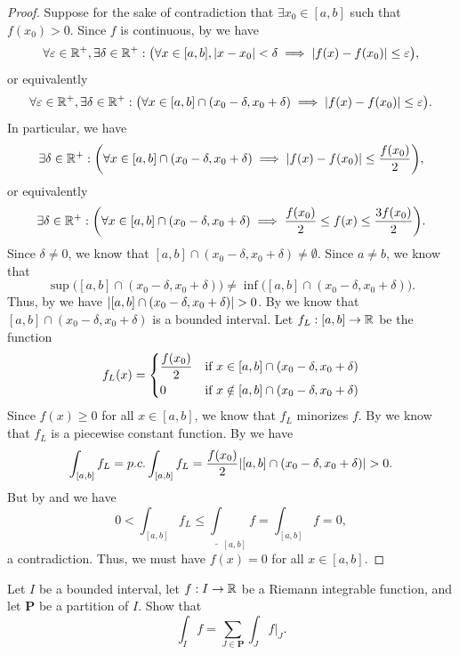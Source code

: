\begin{proof}
  Suppose for the sake of contradiction that \(\exists x_0 \in [a, b]\) such that \(f(x_0) > 0\).
  Since \(f\) is continuous, by  we have
  \[
    \forall \varepsilon \in \mathbb{R}^+, \exists \delta \in \mathbb{R}^+ : \big(\forall x \in [a, b], \left\lvert x - x_0\right\rvert < \delta \implies \left\lvert f(x) - f(x_0)\right\rvert \leq \varepsilon\big),
  \]
  or equivalently
  \[
    \forall \varepsilon \in \mathbb{R}^+, \exists \delta \in \mathbb{R}^+ : \big(\forall x \in [a, b] \cap (x_0 - \delta, x_0 + \delta) \implies \left\lvert f(x) - f(x_0)\right\rvert \leq \varepsilon\big).
  \]
  In particular, we have
  \[
    \exists \delta \in \mathbb{R}^+ : \bigg(\forall x \in [a, b] \cap (x_0 - \delta, x_0 + \delta) \implies \left\lvert f(x) - f(x_0)\right\rvert \leq \dfrac{f(x_0)}{2}\bigg),
  \]
  or equivalently
  \[
    \exists \delta \in \mathbb{R}^+ : \bigg(\forall x \in [a, b] \cap (x_0 - \delta, x_0 + \delta) \implies \dfrac{f(x_0)}{2} \leq f(x) \leq \dfrac{3 f(x_0)}{2}\bigg).
  \]
  Since \(\delta \neq 0\), we know that \([a, b] \cap (x_0 - \delta, x_0 + \delta) \neq \emptyset\).
  Since \(a \neq b\), we know that
  \[
    \sup\big([a, b] \cap (x_0 - \delta, x_0 + \delta)\big) \neq \inf\big([a, b] \cap (x_0 - \delta, x_0 + \delta)\big).
  \]
  Thus, by  we have \(\left\lvert[a, b] \cap (x_0 - \delta, x_0 + \delta)\right\rvert > 0\).
  By  we know that \([a, b] \cap (x_0 - \delta, x_0 + \delta)\) is a bounded interval.
  Let \(f_L : [a, b] \to \mathbb{R}\) be the function
  \[
    f_L(x) = \begin{dcases}
      \dfrac{f(x_0)}{2} & \text{if } x \in [a, b] \cap (x_0 - \delta, x_0 + \delta)    \\
      0                 & \text{if } x \notin [a, b] \cap (x_0 - \delta, x_0 + \delta)
    \end{dcases}
  \]
  Since \(f(x) \geq 0\) for all \(x \in [a, b]\), we know that \(f_L\) minorizes \(f\).
  By  we know that \(f_L\) is a piecewise constant function.
  By  we have
  \[
    \int_{[a, b]} f_L = p.c. \int_{[a, b]} f_L = \dfrac{f(x_0)}{2}\abs{[a, b] \cap (x_0 - \delta, x_0 + \delta)} > 0.
  \]
  But by  and  we have
  \[
    0 < \int_{[a, b]} f_L \leq \underline{\int}_{[a, b]} f = \int_{[a, b]} f = 0,
  \]
  a contradiction.
  Thus, we must have \(f(x) = 0\) for all \(x \in [a, b]\).
\end{proof}

\begin{ex}\label{i:ex:11.4.3}
  Let \(I\) be a bounded interval, let \(f : I \to \mathbb{R}\) be a Riemann integrable function, and let \(\mathbf{P}\) be a partition of \(I\).
  Show that
  \[
    \int_I f = \sum_{J \in \mathbf{P}} \int_J f|_J.
  \]
\end{ex}

